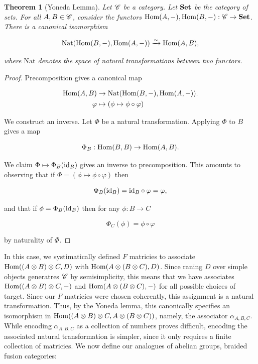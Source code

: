 \documentclass{article}
\newtheorem{theorem}{Theorem}[section]
\theoremstyle{definition}
\numberwithin{figure}{section}
\begin{document}
\begin{theorem}[Yoneda Lemma] Let $\mathscr{C}$ be a category. Let $\bold{Set}$ be the category of sets. For all $A,B\in \mathscr{C}$, consider the functors $\mathrm{Hom}(A,\--),\mathrm{Hom}(B,\--):\mathscr{C}\to \bold{Set}$. There is a canonical isomorphism

$$\mathrm{Nat}(\mathrm{Hom}(B,\--),\mathrm{Hom}(A,\--))\xrightarrow{\sim}\mathrm{Hom}(A,B),$$

where $\mathrm{Nat}$ denotes the space of natural transformations between two functors.
\end{theorem}
\begin{proof} Precomposition gives a canonical map

\begin{align*}
\mathrm{Hom}(A,B)&\to \mathrm{Nat}(\mathrm{Hom}(B,\--),\mathrm{Hom}(A,\--)).\\
\varphi &\mapsto \left(\phi \mapsto \phi\circ \varphi\right)
\end{align*}

We construct an inverse. Let $\Phi$ be a natural transformation. Applying $\Phi$ to $B$ gives a map

$$\Phi_B: \mathrm{Hom}(B,B)\to \mathrm{Hom}(A,B).$$

We claim $\Phi\mapsto \Phi_B(\mathrm{id}_B)$ gives an inverse to precomposition. This amounts to observing that if $\Phi=(\phi\mapsto \phi\circ \varphi)$ then

$$\Phi_B(\mathrm{id}_B)=\mathrm{id}_{B}\circ \varphi=\varphi,$$

and that if $\phi=\Phi_B(\mathrm{id}_B)$ then for any $\phi: B\to C$

$$\Phi_C(\phi)=\phi\circ \varphi$$

by naturality of $\Phi$.
\end{proof}

In this case, we systimatically defined $F$ matricies to associate  $\mathrm{Hom}((A\otimes B)\otimes C,D)$ with $\mathrm{Hom}(A\otimes (B\otimes C),D)$. Since raning $D$ over simple objects generatres $\mathscr{C}$ by semisimplicity, this means that we have associates $\mathrm{Hom}((A\otimes B)\otimes C,\--)$ and $\mathrm{Hom}(A\otimes (B\otimes C),\--)$ for all possible choices of target. Since our $F$ matricies were chosen coherently, this assignment is a natural transformation. Thus, by the Yoneda lemma, this canonically specifies an isomorphism in $\mathrm{Hom}((A\otimes B)\otimes C,A\otimes (B\otimes C))$, namely, the associator $\alpha_{A,B,C}$. While encoding $\alpha_{A,B,C}$ as a collection of numbers proves difficult, encoding the associated natural transformation is simpler, since it only requires a finite collection of matricies. We now define our analogues of abelian groups, braided fusion categories:
\end{document}
